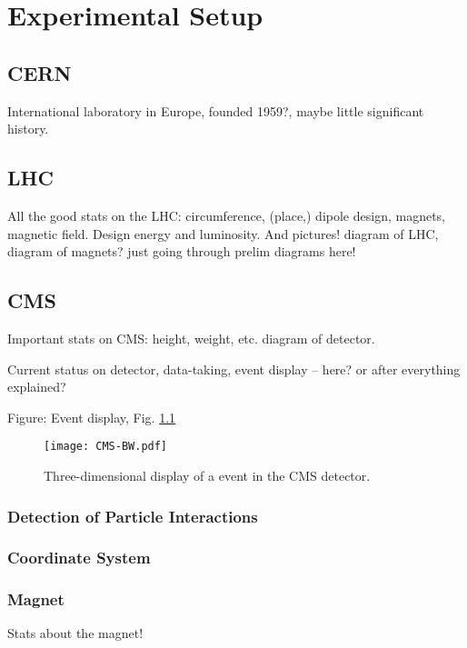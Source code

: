 \chapter{Experimental Setup}
\section{CERN}
International laboratory in Europe, founded 1959?, maybe little significant history.  

\section{LHC}
All the good stats on the LHC: circumference, (place,) dipole design, magnets, magnetic field.  Design energy and luminosity.  
And pictures!  diagram of LHC, diagram of magnets?  just going through prelim diagrams here!

\section{CMS}
Important stats on CMS: height, weight, etc.  diagram of detector.  

Current status on detector, data-taking, event display -- here? or after everything explained?  

Figure: Event display, Fig. \ref{fig:EventDisplay}

 \begin{figure}[htb]
  \begin{center}
    \texttt{[image: CMS-BW.pdf]}
  \end{center}
  \caption[Three-dimensional display of a \Zee event in the CMS detector]{Three-dimensional display of a \Zee event in the CMS detector.}
  \label{fig:EventDisplay}
 \end{figure}

\subsection{Detection of Particle Interactions}

\subsection{Coordinate System}


\subsection{Magnet}
Stats about the magnet!

